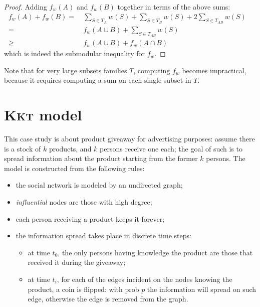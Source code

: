 \begin{proof}
    Adding $f_w(A)$ and $f_w(B)$ together in terms of the above sums:
    \begin{align*}
               f_w(A) + f_w(B) 
           =&\ \sum_{S \in T_A} w(S) + \sum_{S \in T_B} w(S) + 2 \sum_{S \in T_{AB}} w(S)   & \\
           =&\ f_w(A \cup B) + \sum_{S \in T_{AB}} w(S)                                     & \\
        \geq&\ f_w(A \cup B) + f_w(A \cap B)                                                & 
    \end{align*}
    which is indeed the submodular inequality for $f_w$.
\end{proof}

Note that for very large subsets families $T$, computing $f_w$ becomes impractical, because it requires computing a sum on each single subset in $T$.


\section{\textsc{Kkt} model}


This case study is about product giveaway for advertising purposes: assume there is a stock of $k$ products, and $k$ persons receive one each; the goal of such is to spread information about the product starting from the former $k$ persons. The model is constructed from the following rules:

\begin{itemize}
    \item the social network is modeled by an undirected graph;
    \item \emph{influential} nodes are those with high degree;
    \item each person receiving a product keeps it forever;
    \item the information spread takes place in discrete time steps:
    \begin{itemize}
        \item at time $t_0$, the only persons having knowledge the product are those that received it during the giveaway;
        \item at time $t_i$, for each of the edges incident on the nodes knowing the product, a coin is flipped: with prob $p$ the information will spread on such edge, otherwise the edge is removed from the graph.
    \end{itemize}  
\end{itemize} 

